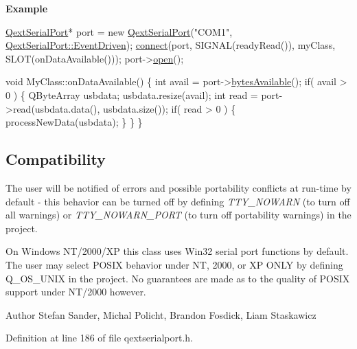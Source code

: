 {\bfseries Example} 
\begin{DoxyCode}
\hyperlink{class_qext_serial_port}{QextSerialPort}* port = \textcolor{keyword}{new} \hyperlink{class_qext_serial_port_ae3c7c54113b3902a9aa96d96ee959593}{QextSerialPort}(\textcolor{stringliteral}{"COM1"}, 
      \hyperlink{class_qext_serial_port_a6002128d7351ea9a958d6a6d1fc6b9bdac03ed747e358e47dbc2b82a8da1d9d0f}{QextSerialPort::EventDriven});
\hyperlink{namespace_qxt_meta_object_a0672fb5917d321762dfd192f229469d5}{connect}(port, SIGNAL(readyRead()), myClass, SLOT(onDataAvailable()));
port->\hyperlink{class_qext_serial_port_a86720bd25b34082c1270b7e42c2216a0}{open}();

\textcolor{keywordtype}{void} MyClass::onDataAvailable() \{
    \textcolor{keywordtype}{int} avail = port->\hyperlink{class_qext_serial_port_a53fa9f6c9beea94f88caf1abb69fcbfb}{bytesAvailable}();
    \textcolor{keywordflow}{if}( avail > 0 ) \{
        QByteArray usbdata;
        usbdata.resize(avail);
        \textcolor{keywordtype}{int} read = port->read(usbdata.data(), usbdata.size());
        \textcolor{keywordflow}{if}( read > 0 ) \{
            processNewData(usbdata);
        \}
    \}
\}
\end{DoxyCode}
\hypertarget{class_qext_serial_port_Compatibility}{}\subsection{Compatibility}\label{class_qext_serial_port_Compatibility}
The user will be notified of errors and possible portability conflicts at run-\/time by default -\/ this behavior can be turned off by defining {\itshape T\-T\-Y\-\_\-\-N\-O\-W\-A\-R\-N} (to turn off all warnings) or {\itshape T\-T\-Y\-\_\-\-N\-O\-W\-A\-R\-N\-\_\-\-P\-O\-R\-T} (to turn off portability warnings) in the project.

On Windows N\-T/2000/\-X\-P this class uses Win32 serial port functions by default. The user may select P\-O\-S\-I\-X behavior under N\-T, 2000, or X\-P O\-N\-L\-Y by defining Q\-\_\-\-O\-S\-\_\-\-U\-N\-I\-X in the project. No guarantees are made as to the quality of P\-O\-S\-I\-X support under N\-T/2000 however.

\begin{DoxyAuthor}{Author}
Stefan Sander, Michal Policht, Brandon Fosdick, Liam Staskawicz 
\end{DoxyAuthor}


Definition at line 186 of file qextserialport.\-h.



